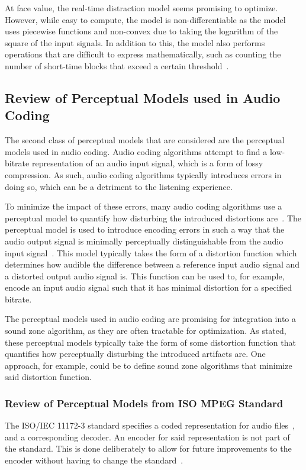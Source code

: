 At face value, the real-time distraction model seems promising to optimize.
However, while easy to compute, the model is non-differentiable as the model uses
piecewise functions and non-convex due to taking the logarithm of the square of the input signals.
In addition to this, the model also performs operations that are difficult to express mathematically, such as counting the number of short-time blocks that exceed a certain threshold~\cite{ramo2017real}.

\subsection{Review of Perceptual Models used in Audio Coding}
\label{ch:perceptual:review:audio_coding}
The second class of perceptual models that are considered are the perceptual models used in audio coding.
Audio coding algorithms attempt to find a low-bitrate representation of an audio input signal, which is a 
form of lossy compression.
As such, audio coding algorithms typically introduces errors in doing so, 
which can be a detriment to the listening experience.

To minimize the impact of these errors, many audio coding algorithms use a perceptual model to quantify 
how disturbing the introduced distortions are~\cite{herre2019psychoacoustic}.
The perceptual model is used to introduce encoding errors in such a way that the audio output signal is minimally perceptually distinguishable from the audio input signal~\cite{taal2012low}.
This model typically takes the form of a distortion function which determines how audible the difference between a reference input audio signal and a distorted output audio signal is.
This function can be used to, for example, encode an input audio signal such that it has minimal distortion for a specified bitrate.

The perceptual models used in audio coding are promising for integration into a sound zone algorithm, as they are often tractable for optimization.
As stated, these perceptual models typically take the form of some distortion function that quantifies how perceptually disturbing the introduced artifacts are. 
One approach, for example, could be to define sound zone algorithms that minimize said distortion function.

\subsubsection{Review of Perceptual Models from ISO MPEG Standard}
The ISO/IEC 11172-3 standard specifies a coded representation for audio files~\cite{ISO11172-3}, 
and a corresponding decoder.
An encoder for said representation is not part of the standard.
This is done deliberately to allow for future improvements to the encoder without having to change the standard~\cite{pan1995tutorial}.

